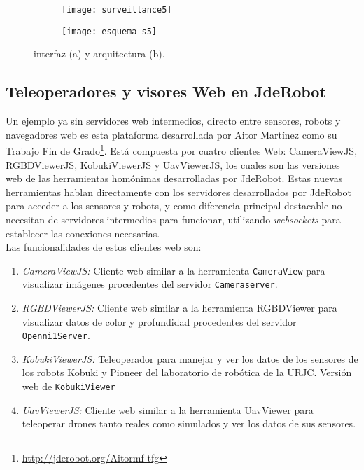 \begin{figure}[h!]
\centering
  \begin{subfigure}[]{110mm}
    \texttt{[image: surveillance5]}
  \end{subfigure}
  \hspace{5pt}
  \begin{subfigure}[]{110mm}
    \texttt{[image: esquema\_s5]}
  \end{subfigure}
  \caption{interfaz (a) y arquitectura (b).}\label{fig:surveillance5}
\end{figure}


\subsection{Teleoperadores y visores Web en JdeRobot}

Un ejemplo ya sin servidores web intermedios, directo entre sensores, robots y navegadores web es esta plataforma desarrollada por Aitor Martínez como su Trabajo Fin de Grado\footnote{\url{http://jderobot.org/Aitormf-tfg}}\cite{teleoperadoresyvisoresweb}. Está compuesta por cuatro clientes Web: CameraViewJS, RGBDViewerJS, KobukiViewerJS y UavViewerJS, los cuales son las versiones web de las herramientas homónimas desarrolladas por JdeRobot. Estas nuevas herramientas hablan directamente con los servidores desarrollados por JdeRobot para acceder a los sensores y robots, y como diferencia principal destacable no necesitan de servidores intermedios para funcionar, utilizando \emph{websockets} para establecer las conexiones necesarias.\\

\noindent Las funcionalidades de estos clientes web son: 

\begin{enumerate}

\item \emph{CameraViewJS:} Cliente web similar a la herramienta \texttt{CameraView} para visualizar imágenes procedentes del servidor \texttt{Cameraserver}. 

\item \emph{RGBDViewerJS:} Cliente web similar a la herramienta RGBDViewer para visualizar datos de color y profundidad procedentes del servidor \texttt{Openni1Server}.
  
\item \emph{KobukiViewerJS:} Teleoperador para manejar y ver los datos de los sensores de los robots Kobuki y Pioneer del laboratorio de robótica de la URJC. Versión web de \texttt{KobukiViewer}
  
  
\item \emph{UavViewerJS:} Cliente web similar a la herramienta UavViewer para teleoperar drones tanto reales como simulados y ver los datos de sus sensores.


\end{enumerate}

